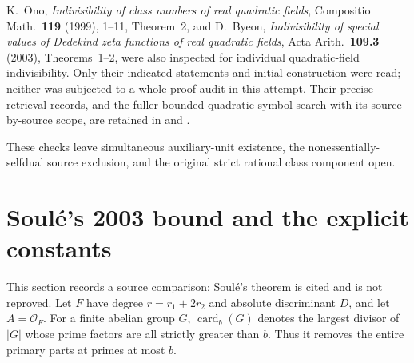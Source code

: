 \documentclass[11pt,a4paper]{article}
\theoremstyle{definition}
\begin{document}
K.~Ono, \emph{Indivisibility of class numbers of real
quadratic fields}, Compositio Math.~\textbf{119} (1999),
1--11, Theorem~2, and D.~Byeon, \emph{Indivisibility of
special values of Dedekind zeta functions of real quadratic
fields}, Acta Arith.~\textbf{109.3} (2003),
Theorems~1--2, were also inspected for individual
quadratic-field indivisibility.  Only their indicated
statements and initial construction were read; neither
was subjected to a whole-proof audit in this attempt.
Their precise retrieval records, and the fuller bounded
quadratic-symbol search with its source-by-source scope,
are retained in
 and
.

These checks leave simultaneous auxiliary-unit existence,
the nonessentially-selfdual source exclusion, and the
original strict rational class component open.



\section{Soul\'e's 2003 bound and the explicit constants}
\label{sec:soule}

This section records a source comparison; Soul\'e's theorem
is cited and is not reproved. Let $F$ have degree
$r=r_1+2r_2$ and absolute discriminant $D$, and let
$A=\mathcal O_F$. For a finite abelian group $G$,
$\operatorname{card}_b(G)$ denotes the largest divisor of
$|G|$ whose prime factors are all strictly greater than $b$.
Thus it removes the entire primary parts at primes at most $b$.
\end{document}
